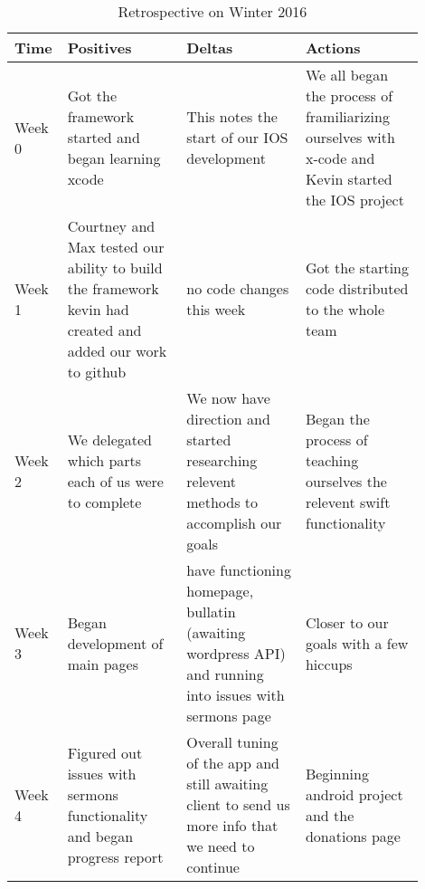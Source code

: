 \documentclass[letterpaper,10pt,draftclsnofoot,onecolumn,titlepage]{IEEEtran}
\begin{document}
		\begin{table}[H]
			\caption{Retrospective on Winter 2016}
			\begin{center}
				\begin{tabular}{| p{0.06\linewidth} | p{0.28\linewidth} | p{0.28\linewidth} | p{0.28\linewidth} | }
					\hline
					\textbf{Time} & \textbf{Positives} & \textbf{Deltas} & \textbf{Actions} \\ [0.5ex]
					\hline
					Week 0 & Got the framework started and began learning xcode & This notes the start of our IOS development & We all began the process of framiliarizing ourselves with x-code and Kevin started the IOS project \\
					\hline
					Week 1 & Courtney and Max tested our ability to build the framework kevin had created and added our work to github & no code changes this week & Got the starting code distributed to the whole team \\
					\hline
					Week 2 & We delegated which parts each of us were to complete & We now have direction and started researching relevent methods to accomplish our goals & Began the process of teaching ourselves the relevent swift functionality \\
					\hline
					Week 3 & Began development of main pages & have functioning homepage, bullatin (awaiting wordpress API) and running into issues with sermons page & Closer to our goals with a few hiccups \\
					\hline
					Week 4 & Figured out issues with sermons functionality and began progress report & Overall tuning of the app and still awaiting client to send us more info that we need to continue & Beginning android project and the donations page \\
					\hline
					
\end{tabular}
			\end{center}
			\end{table}
\end{document}
